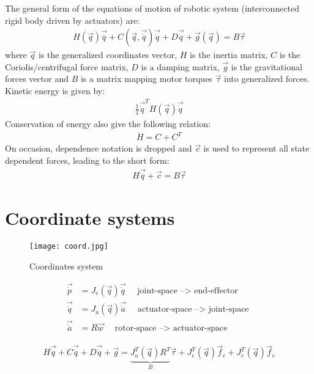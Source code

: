 The general form of the equations of motion of robotic system (interconnected rigid body driven by actuators) are:
%
\begin{align}
H(\vec{q}) \vec{\ddot{q}} + C(\vec{q},\vec{\dot{q}}) \vec{\dot{q}} + D \vec{\dot{q}} + \vec{g}(\vec{q}) = B \vec{\tau} 
\label{eq:manipulator}
\end{align}
%
where $\vec{q}$ is the generalized coordinates vector, $H$ is the inertia matrix, $C$ is the Coriolis/centrifugal force matrix, $D$ is a damping matrix, $\vec{g}$ is the gravitational forces vector and $B$ is a matrix mapping motor torques $\vec{\tau}$ into generalized forces.
%
Kinetic energy is given by:
%
\begin{align}
\frac{1}{2} \vec{\dot{q}}^T H(\vec{q}) \vec{\dot{q}} 
\label{eq:kinetic}
\end{align}
%
Conservation of energy also give the following relation:
%
\begin{align}
\dot{H} = C + C^T
\label{eq:kinetic}
\end{align}
%
On occasion, dependence notation is dropped and $\vec{c}$ is used to represent all state dependent forces, leading to the short form:
%
\begin{align}
H \vec{\ddot{q}} + \vec{c} = B \vec{\tau} 
\label{eq:manipulator_short}
\end{align}

\section{Coordinate systems}
\label{sec:coord}


\begin{figure}[H]
	\centering
		\texttt{[image: coord.jpg]}
	\caption{Coordinates system}
	\label{fig:coord}
\end{figure}

\begin{align}
\vec{\dot{p}}   &= J_e( \vec{q} ) \vec{\dot{q} }  \quad \text{ joint-space    --> end-effector   } \\
\vec{\dot{q}}   &= J_a( \vec{q} ) \vec{\dot{a} }  \quad \text{ actuator-space --> joint-space    } \\
\vec{\dot{a} }  &= R              \vec{ w      }  \quad \text{ rotor-space    --> actuator-space } 
\label{eq:coord_transform}
\end{align}


\begin{align}
H \vec{\ddot{q}} + C \vec{\dot{q}} + D \vec{\dot{q}} + \vec{g} =  \underbrace{ J_a^T(\vec{q}) R^T }_B  \vec{\tau} + J_e^T(\vec{q}) \vec{f}_e + J_c^T(\vec{q}) \vec{f}_c
\label{eq:manipulator}
\end{align}

